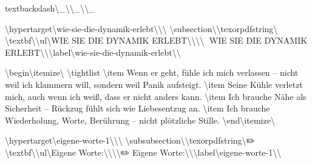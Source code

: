 textbackslash{}\textbackslash{}_\textbackslash{}\textbackslash{}_\textbackslash{}\textbackslash{}_

\textbackslash{}hypertarget\textbackslash{}{wie-sie-die-dynamik-erlebt\textbackslash{}}\textbackslash{}{\textbackslash{}%
\textbackslash{}subsection\textbackslash{}{\textbackslash{}texorpdfstring\textbackslash{}{🧩 \textbackslash{}textbf\textbackslash{}{\textbackslash{}ul\textbackslash{}{WIE SIE DIE DYNAMIK ERLEBT\textbackslash{}}\textbackslash{}}\textbackslash{}}\textbackslash{}{🧩 WIE SIE DIE DYNAMIK ERLEBT\textbackslash{}}\textbackslash{}}\textbackslash{}label\textbackslash{}{wie-sie-die-dynamik-erlebt\textbackslash{}}\textbackslash{}}

\textbackslash{}begin\textbackslash{}{itemize\textbackslash{}}
\textbackslash{}tightlist
\textbackslash{}item
  Wenn er geht, fühle ich mich verlassen -- nicht weil ich klammern will, sondern weil Panik aufsteigt.
\textbackslash{}item
  Seine Kühle verletzt mich, auch wenn ich weiß, dass er nicht anders kann.
\textbackslash{}item
  Ich brauche Nähe als Sicherheit -- Rückzug fühlt sich wie Liebesentzug an.
\textbackslash{}item
  Ich brauche Wiederholung, Worte, Berührung -- nicht plötzliche Stille.
\textbackslash{}end\textbackslash{}{itemize\textbackslash{}}

\textbackslash{}hypertarget\textbackslash{}{eigene-worte-1\textbackslash{}}\textbackslash{}{\textbackslash{}%
\textbackslash{}subsubsection\textbackslash{}{\textbackslash{}texorpdfstring\textbackslash{}{✏️ \textbackslash{}textbf\textbackslash{}{\textbackslash{}ul\textbackslash{}{Eigene Worte:\textbackslash{}}\textbackslash{}}\textbackslash{}}\textbackslash{}{✏️ Eigene Worte:\textbackslash{}}\textbackslash{}}\textbackslash{}label\textbackslash{}{eigene-worte-1\textbackslash{}}\textbackslash{}}

